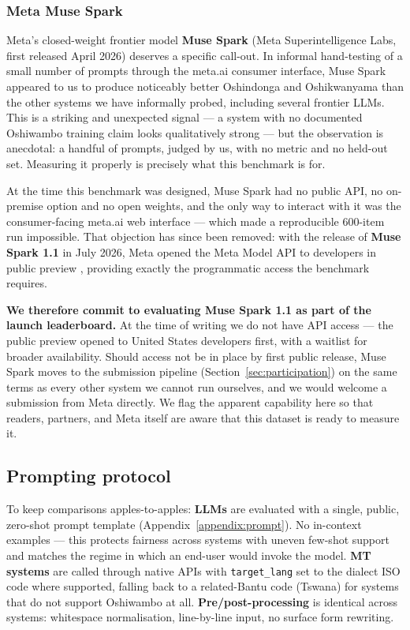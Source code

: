 \documentclass[11pt]{article}
\begin{document}
\subsubsection*{Meta Muse Spark}

Meta's closed-weight frontier model \textbf{Muse Spark} (Meta
Superintelligence Labs, first released April 2026) deserves a
specific call-out. In informal hand-testing of a small number of
prompts through the meta.ai consumer interface, Muse Spark appeared
to us to produce noticeably better Oshindonga and Oshikwanyama than
the other systems we have informally probed, including several
frontier LLMs. This is a striking and unexpected signal --- a system
with no documented Oshiwambo training claim looks qualitatively
strong --- but the observation is anecdotal: a handful of prompts,
judged by us, with no metric and no held-out set. Measuring it
properly is precisely what this benchmark is for.

At the time this benchmark was designed, Muse Spark had no public
API, no on-premise option and no open weights, and the only way to
interact with it was the consumer-facing meta.ai web interface ---
which made a reproducible 600-item run impossible. That objection
has since been removed: with the release of \textbf{Muse Spark
1.1} in July 2026, Meta opened the Meta Model API to developers in
public preview \citep{meta2026musespark}, providing exactly the
programmatic access the benchmark requires.

\textbf{We therefore commit to evaluating Muse Spark 1.1 as part of
the launch leaderboard.} At the time of writing we do not have
API access --- the public preview opened to United States
developers first, with a waitlist for broader availability. Should
access not be in place by first public release, Muse Spark moves to
the submission pipeline
(Section~\ref{sec:participation}) on the same terms as every other
system we cannot run ourselves, and we would welcome a submission
from Meta directly. We flag the apparent capability here so that
readers, partners, and Meta itself are aware that this dataset is
ready to measure it.

\subsection{Prompting protocol}

To keep comparisons apples-to-apples: \textbf{LLMs} are evaluated
with a single, public, zero-shot prompt template
(Appendix~\ref{appendix:prompt}). No in-context examples --- this
protects fairness across systems with uneven few-shot support and
matches the regime in which an end-user would invoke the model.
\textbf{MT systems} are called through native APIs with
\texttt{target\_lang} set to the dialect ISO code where supported,
falling back to a related-Bantu code (Tswana) for systems that do
not support Oshiwambo at all. \textbf{Pre/post-processing} is
identical across systems: whitespace normalisation, line-by-line
input, no surface form rewriting.
\end{document}
